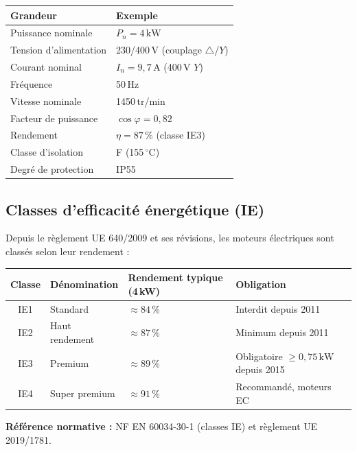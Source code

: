 \begin{center}
  \begin{tabular}{ll}
    \toprule
    Grandeur & Exemple \\
    \midrule
    Puissance nominale & $P_n = 4\,\text{kW}$ \\
    Tension d'alimentation & 230/400\,V (couplage $\triangle$/$Y$) \\
    Courant nominal & $I_n = 9{,}7\,\text{A}$ (400\,V $Y$) \\
    Fréquence & 50\,Hz \\
    Vitesse nominale & 1450\,tr/min \\
    Facteur de puissance & $\cos\varphi = 0{,}82$ \\
    Rendement & $\eta = 87\,\%$ (classe IE3) \\
    Classe d'isolation & F (155\,$^\circ$C) \\
    Degré de protection & IP55 \\
    \bottomrule
  \end{tabular}
\end{center}

\subsection{Classes d'efficacité énergétique (IE)}

Depuis le règlement UE 640/2009 et ses révisions, les moteurs électriques sont classés selon leur rendement :

\begin{center}
  \begin{tabular}{clll}
    \toprule
    Classe & Dénomination & Rendement typique (4\,kW) & Obligation \\
    \midrule
    IE1 & Standard           & $\approx 84\,\%$ & Interdit depuis 2011 \\
    IE2 & Haut rendement     & $\approx 87\,\%$ & Minimum depuis 2011 \\
    IE3 & Premium            & $\approx 89\,\%$ & Obligatoire $\geq 0{,}75\,\text{kW}$ depuis 2015 \\
    IE4 & Super premium      & $\approx 91\,\%$ & Recommandé, moteurs EC \\
    \bottomrule
  \end{tabular}
\end{center}

\textbf{Référence normative :} NF EN 60034-30-1 (classes IE) et règlement UE 2019/1781.

